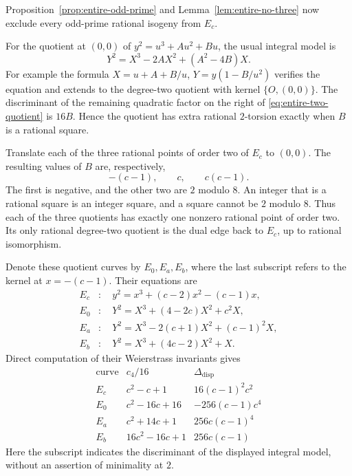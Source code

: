 Proposition~\ref{prop:entire-odd-prime} and
Lemma~\ref{lem:entire-no-three} now exclude every odd-prime rational
isogeny from $E_c$.

For the quotient at $(0,0)$ of
$y^2=u^3+A u^2+B u$, the usual integral model is
\begin{equation}\label{eq:entire-two-quotient}
 Y^2=X^3-2AX^2+(A^2-4B)X.
\end{equation}
For example the formula
$X=u+A+B/u$, $Y=y(1-B/u^2)$ verifies the equation and extends to the
degree-two quotient with kernel $\{O,(0,0)\}$.
The discriminant of the remaining quadratic factor on the right of
\eqref{eq:entire-two-quotient} is $16B$. Hence the quotient has extra
rational $2$-torsion exactly when $B$ is a rational square.

Translate each of the three rational points of order two of $E_c$ to
$(0,0)$. The resulting values of $B$ are, respectively,
\[
 -(c-1),\qquad c,\qquad c(c-1).
\]
The first is negative, and the other two are $2$ modulo $8$. An
integer that is a rational square is an integer square, and a square
cannot be $2$ modulo $8$. Thus each of the three quotients has exactly
one nonzero rational point of order two. Its only rational
degree-two quotient is the dual edge back to $E_c$, up to rational
isomorphism.

Denote these quotient curves by $E_0,E_a,E_b$, where the last
subscript refers to the kernel at $x=-(c-1)$. Their equations are
\begin{equation}\label{eq:entire-models}
 \begin{aligned}
 E_c&:\quad y^2=x^3+(c-2)x^2-(c-1)x,\\
 E_0&:\quad Y^2=X^3+(4-2c)X^2+c^2X,\\
 E_a&:\quad Y^2=X^3-2(c+1)X^2+(c-1)^2X,\\
 E_b&:\quad Y^2=X^3+(4c-2)X^2+X.
 \end{aligned}
\end{equation}
Direct computation of their Weierstrass invariants gives
\begin{equation}\label{eq:entire-invariants}
 \begin{array}{c|c|c}
 \text{curve}&c_4/16&\Delta_{\mathrm{disp}}\\ \hline
 E_c&c^2-c+1&16(c-1)^2c^2\\
 E_0&c^2-16c+16&-256(c-1)c^4\\
 E_a&c^2+14c+1&256c(c-1)^4\\
 E_b&16c^2-16c+1&256c(c-1)
 \end{array}
\end{equation}
Here the subscript indicates the discriminant of the displayed
integral model, without an assertion of minimality at $2$.

